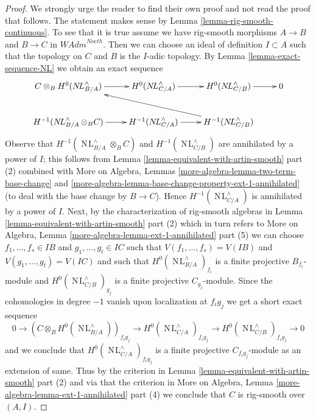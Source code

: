 \documentclass[10pt,a4paper]{amsart}
\theoremstyle{plain}
\theoremstyle{definition}
\theoremstyle{remark}
\numberwithin{equation}{subsection}
\def\NL{\mathop{N\!L}\nolimits}
\begin{document}
\begin{proof}
We strongly urge the reader to find their own proof and not read the proof
that follows. The statement makes sense by
Lemma \ref{lemma-rig-smooth-continuous}.
To see that it is true assume we have rig-smooth morphisms
$A \to B$ and $B \to C$ in $\textit{WAdm}^{Noeth}$.
Then we can choose an ideal of definition $I \subset A$
such that the topology on $C$ and $B$ is the $I$-adic topology.
By Lemma \ref{lemma-exact-sequence-NL} we obtain an exact sequence
$$
\xymatrix{
C \otimes_B H^0(\NL_{B/A}^\wedge) \ar[r] &
H^0(\NL_{C/A}^\wedge) \ar[r] &
H^0(\NL_{C/B}^\wedge) \ar[r] & 0 \\
H^{-1}(\NL_{B/A}^\wedge \otimes_B C) \ar[r] &
H^{-1}(\NL_{C/A}^\wedge) \ar[r] &
H^{-1}(\NL_{C/B}^\wedge) \ar[llu]
}
$$
Observe that $H^{-1}(\NL_{B/A}^\wedge \otimes_B C)$
and $H^{-1}(\NL_{C/B}^\wedge)$ are annihilated by
a power of $I$; this follows from
Lemma \ref{lemma-equivalent-with-artin-smooth} part (2)
combined with
More on Algebra, Lemmas \ref{more-algebra-lemma-two-term-base-change} and
\ref{more-algebra-lemma-base-change-property-ext-1-annihilated}
(to deal with the base change by $B \to C$).
Hence $H^{-1}(\NL_{C/A}^\wedge)$ is annihilated by a power of $I$.
Next, by the characterization of rig-smooth algebras in
Lemma \ref{lemma-equivalent-with-artin-smooth} part (2)
which in turn refers to
More on Algebra, Lemma \ref{more-algebra-lemma-ext-1-annihilated} part (5)
we can choose $f_1, \ldots, f_s \in IB$ and $g_1, \ldots, g_t \in IC$
such that $V(f_1, \ldots, f_s) = V(IB)$ and
$V(g_1, \ldots, g_t) = V(IC)$ and such that
$H^0(\NL_{B/A}^\wedge)_{f_i}$ is a finite projective $B_{f_i}$-module and
$H^0(\NL_{C/B}^\wedge)_{g_j}$ is a finite projective $C_{g_j}$-module.
Since the cohomologies in degree $-1$ vanish upon localization at
$f_ig_j$ we get a short exact sequence
$$
0 \to
(C \otimes_B H^0(\NL_{B/A}^\wedge))_{f_ig_j} \to
H^0(\NL_{C/A}^\wedge)_{f_ig_j} \to
H^0(\NL_{C/B}^\wedge)_{f_ig_j} \to 0
$$
and we conclude that $H^0(\NL_{C/A}^\wedge)_{f_ig_j}$ is a finite
projective $C_{f_ig_j}$-module as an extension of same.
Thus by the criterion in
Lemma \ref{lemma-equivalent-with-artin-smooth} part (2)
and via that the criterion in
More on Algebra, Lemma \ref{more-algebra-lemma-ext-1-annihilated} part (4)
we conclude that $C$ is rig-smooth over $(A, I)$.
\end{proof}
\end{document}
